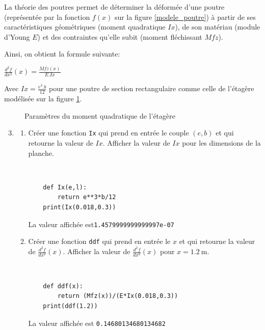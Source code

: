 La théorie des poutres permet de déterminer la déformée d'une poutre (représentée par la fonction $f(x)$ sur la figure \ref{modele_poutre}) à partir de ses caractéristiques géométriques (moment quadratique $Ix$), de son matériau (module d'Young $E$) et des contraintes qu'elle subit (moment fléchissant $Mfz$).

Ainsi, on obtient la formule suivante:

\begin{center}
$\frac{d^2 f}{dx^2}(x)=\frac{Mfz(x)}{E.Ix}$
\end{center}

Avec $Ix=\frac{e^3.b}{12}$ pour une poutre de section rectangulaire comme celle de l'étagère modélisée sur la figure \ref{moment_quadratique}.

\begin{figure}[ht!]
 \begin{center}
  \def\svgwidth{0.4\linewidth}
  \Large{
  }
 \end{center}
 \caption{Paramètres du moment quadratique de l'étagère}
 \label{moment_quadratique}
 \end{figure}

\begin{enumerate}
\setcounter{enumi}{2}
\item \begin{enumerate}
\item Créer une fonction \verb?Ix? qui prend en entrée le couple $(e,b)$ et qui retourne la valeur de $Ix$. Afficher la valeur de $Ix$ pour les dimensions de la planche.
 \begin{solution}~\ \\
  \begin{verbatim}
	def Ix(e,l):
    	return e**3*b/12
	print(Ix(0.018,0.3))
  \end{verbatim}
 La valeur affichée est\verb?1.4579999999999997e-07?
\end{solution}
\item Créer une fonction \verb?ddf? qui prend en entrée le $x$ et qui retourne la valeur de $\frac{d^2 f}{dx^2}(x)$. Afficher la valeur de $\frac{d^2 f}{dx^2}(x)$ pour $x=\SI{1,2}{\meter}$.
 \begin{solution}~\ \\
  \begin{verbatim}
	def ddf(x):
    	return (Mfz(x))/(E*Ix(0.018,0.3))
	print(ddf(1.2))
 \end{verbatim}
 La valeur affichée est \verb?0.14680134680134682?
\end{solution}
\end{enumerate}
\end{enumerate}


